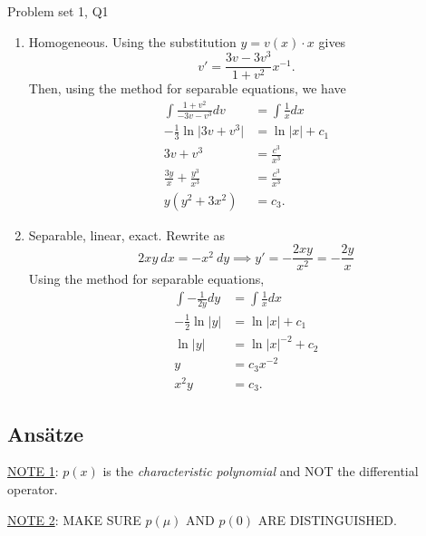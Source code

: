 \begin{problem}{Problem set 1, Q1}{}
\begin{enumerate}
\begin{align*}
                &= \frac{2(x^2 + 2x + 1) - 2}{(x+1)^3}
                    + \frac{c_5}{(x+1)^3} \\
                &= \frac{2}{x + 1} + \frac{c_6}{(x+1)^3} .
            \end{align*}
        \item Homogeneous. Using the substitution $y = v(x) \cdot x$ gives
            $$ v' = \frac{3v - 3v^3}{1 + v^2} x^{-1} . $$
        Then, using the method for separable equations, we have
            \begin{align*}
                \int \frac{1 + v^2}{-3v - v^3} dv
                    &= \int \frac{1}{x} dx \\
                -\frac{1}{3} \ln \lvert 3v + v^3 \rvert
                    &= \ln \lvert x \rvert + c_1 \\
                3v + v^3 &= \frac{c^3}{x^3} \\
                \frac{3y}{x} + \frac{y^3}{x^3} &= \frac{c^3}{x^3} \\
                y(y^2 + 3x^2) &= c_3 .
            \end{align*}
        \item Separable, linear, exact. Rewrite as
            $$ 2xy \ dx = -x^2 \ dy \implies y' = -\frac{2xy}{x^2}
                = -\frac{2y}{x} $$
        Using the method for separable equations,
            \begin{align*}
                \int -\frac{1}{2y} dy &= \int \frac{1}{x} dx \\
                -\frac{1}{2} \ln \lvert y \rvert
                    &= \ln \lvert x \rvert + c_1 \\
                \ln \lvert y \rvert &= \ln \lvert x \rvert^{-2} + c_2 \\
                y &= c_3 x^{-2} \\
                x^2 y &= c_3 .
            \end{align*}
    \end{enumerate}
    
\end{problem}

\subsection{Ansätze}

\underline{NOTE 1}: $p(x)$ is the \textit{characteristic polynomial} and NOT the differential operator.

\underline{NOTE 2}: MAKE SURE $p(\mu)$ AND $p(0)$ ARE DISTINGUISHED.

